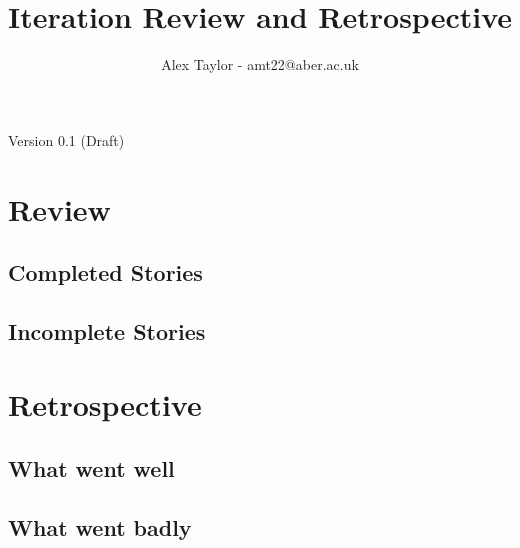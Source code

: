 \documentclass{article}
\title{Iteration Review and Retrospective}
\author{Alex Taylor - amt22@aber.ac.uk}
\begin{document}
\maketitle
\begin{center}
	Version 0.1 (Draft)
\end{center}
\tableofcontents
\thispagestyle{empty}
\newpage

\section{Review}
\subsection{Completed Stories}
\subsection{Incomplete Stories}
\newpage

\section{Retrospective}
\subsection{What went well}

\subsection{What went badly}
\end{document}
